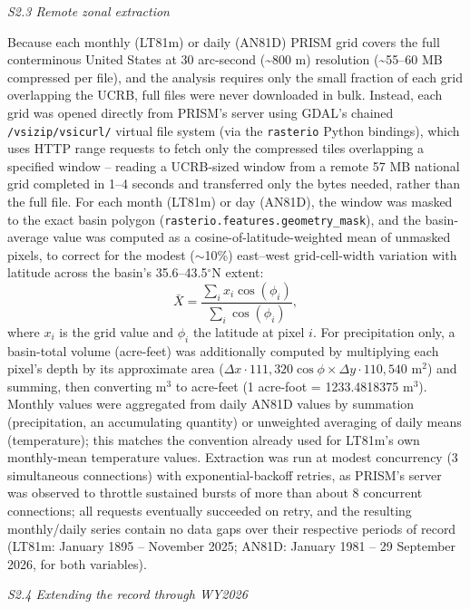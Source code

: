 \documentclass[draft,grl]{agutexSI2019}
\begin{document}
\begin{article}
\noindent\textit{S2.3 Remote zonal extraction}

Because each monthly (LT81m) or daily (AN81D) PRISM grid covers the full conterminous United States at 30 arc-second (\textasciitilde800 m) resolution (\textasciitilde55--60 MB compressed per file), and the analysis requires only the small fraction of each grid overlapping the UCRB, full files were never downloaded in bulk. Instead, each grid was opened directly from PRISM's server using GDAL's chained \texttt{/vsizip/vsicurl/} virtual file system \cite{gdal2026} (via the \texttt{rasterio} Python bindings), which uses HTTP range requests to fetch only the compressed tiles overlapping a specified window -- reading a UCRB-sized window from a remote 57 MB national grid completed in 1--4 seconds and transferred only the bytes needed, rather than the full file. For each month (LT81m) or day (AN81D), the window was masked to the exact basin polygon (\texttt{rasterio.features.geometry\_mask}), and the basin-average value was computed as a cosine-of-latitude-weighted mean of unmasked pixels, to correct for the modest ($\sim$10\%) east--west grid-cell-width variation with latitude across the basin's 35.6--43.5$^\circ$N extent:
\begin{equation}
\bar{X} = \frac{\sum_i x_i \cos(\phi_i)}{\sum_i \cos(\phi_i)},
\end{equation}
where $x_i$ is the grid value and $\phi_i$ the latitude at pixel $i$. For precipitation only, a basin-total volume (acre-feet) was additionally computed by multiplying each pixel's depth by its approximate area ($\Delta x \cdot 111{,}320\cos\phi \times \Delta y \cdot 110{,}540$ m$^2$) and summing, then converting m$^3$ to acre-feet (1 acre-foot = 1233.4818375 m$^3$). Monthly values were aggregated from daily AN81D values by summation (precipitation, an accumulating quantity) or unweighted averaging of daily means (temperature); this matches the convention already used for LT81m's own monthly-mean temperature values. Extraction was run at modest concurrency (3 simultaneous connections) with exponential-backoff retries, as PRISM's server was observed to throttle sustained bursts of more than about 8 concurrent connections; all requests eventually succeeded on retry, and the resulting monthly/daily series contain no data gaps over their respective periods of record (LT81m: January 1895 -- November 2025; AN81D: January 1981 -- 29 September 2026, for both variables).

\noindent\textit{S2.4 Extending the record through WY2026}


\end{article}
\end{document}
